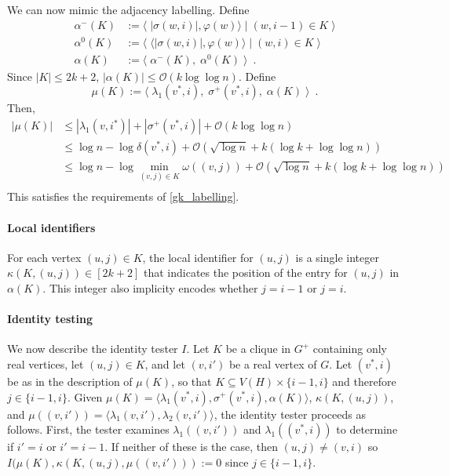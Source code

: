 \documentclass{patmorin}
\renewcommand{\le}{\leqslant}
\newcommand{\Oh}{\calO}
\newcommand{\calO}{\mathcal{O}}
\begin{document}
  We can now mimic the adjacency labelling.  Define
  \begin{align*}
    \alpha^-(K) & := \langle\; |\sigma(w,i)|, \varphi(w)\rangle \mid (w,i-1)\in K \;\rangle \\
    \alpha^0(K) & := \langle\; \langle |\sigma(w,i)|, \varphi(w)\rangle \mid (w,i)\in K \;\rangle \\
    \alpha(K)
    & := \langle\; \alpha^-(K),\; \alpha^0(K)  \;\rangle \enspace .
  \end{align*}
  Since $|K|\le 2k+2$, $|\alpha(K)|\le\Oh(k\log\log n)$.  Define
  \[
     \mu(K) := \langle\; \lambda_1(v^*,i),\; \sigma^+(v^*,i),\; \alpha(K) \;\rangle \enspace .
  \]
  Then, 
  \begin{align*}
    |\mu(K)|
    & \le |\lambda_1(v,i^*)| + |\sigma^+(v^*,i)| + \Oh(k \log\log n) \\
    & \le \log n - \log\delta(v^*,i) + \Oh(\sqrt{\log n} + k(\log k+\log\log n)) \\
    & \le \log n - \log\min_{(v,j)\in K}\omega((v,j)) + \Oh(\sqrt{\log n} + k(\log k+\log\log n)) \\
  \end{align*}
  This satisfies the requirements of \cref{gk_labelling}.

  \paragraph{Local identifiers}

  For each vertex $(u,j)\in K$, the local identifier for $(u,j)$ is a single integer $\kappa(K,(u,j))\in[2k+2]$ that indicates the position of the entry for $(u,j)$ in $\alpha(K)$.  This integer also implicity encodes whether $j=i-1$  or $j=i$.


  \paragraph{Identity testing}

  We now describe the identity tester $I$.  Let $K$ be a clique in $G^+$ containing only real vertices, let $(u,j)\in K$, and let $(v,i')$ be a real vertex of $G$.  Let $(v^*,i)$ be as in the description of $\mu(K)$, so that $K\subseteq V(H)\times\{i-1,i\}$ and therefore $j\in\{i-1,i\}$.   Given $\mu(K)=\langle\lambda_1(v^*,i),\sigma^+(v^*,i),\alpha(K)\rangle$, $\kappa(K,(u,j))$, and $\mu((v,i'))=\langle \lambda_1(v,i'),\lambda_2(v,i')\rangle$, the identity tester proceeds as follows. First, the tester examines $\lambda_1((v,i'))$ and $\lambda_1((v^*,i))$ to determine if $i'=i$ or $i'=i-1$.  If neither of these is the case, then $(u,j)\neq (v,i)$ so $I(\mu(K),\kappa(K,(u,j),\mu((v,i'))):=0$ since $j\in\{i-1,i\}$.
  
\end{document}
